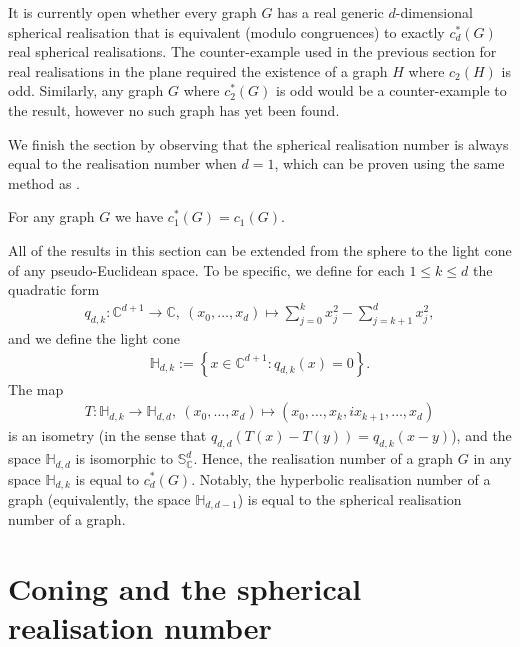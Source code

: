 \documentclass[ALCO]{cedram}
\begin{document}
\begin{remark}
	It is currently open whether every graph $G$ has a real generic $d$-dimensional spherical realisation that is equivalent (modulo congruences) to exactly $c_d^*(G)$ real spherical realisations.
	The counter-example used in the previous section for real realisations in the plane required the existence of a graph $H$ where $c_2(H)$ is odd.
	Similarly, any graph $G$ where $c^*_2(G)$ is odd would be a counter-example to the result, however no such graph has yet been found.
\end{remark}

We finish the section by observing that the spherical realisation number is always equal to the realisation number when $d=1$,
which can be proven using the same method as .

\begin{proposition}\label{p:1dsame}
	For any graph $G$ we have $c_1^*(G) =c_1(G)$.
\end{proposition}

\begin{remark}\label{rem:hyperbolic}
	All of the results in this section can be extended from the sphere to the light cone of any pseudo-Euclidean space.
	To be specific,
	we define for each $1 \leq k \leq d$ the quadratic form
	\begin{align*}
		q_{d,k}: \mathbb{C}^{d+1} \rightarrow \mathbb{C}, ~ (x_0,\ldots,x_{d}) \mapsto \sum_{j=0}^k x_j^2 - \sum_{j=k+1}^d x_j^2,
	\end{align*}
	and we define the light cone
	\begin{align*}
		\mathbb{H}_{d,k} := \left\{ x \in \mathbb{C}^{d+1} : q_{d,k}(x) = 0 \right\}.
	\end{align*}
	The map
	\begin{align*}
		T:\mathbb{H}_{d,k} \rightarrow \mathbb{H}_{d,d}, ~ (x_0,\ldots,x_d) \mapsto (x_0,\ldots, x_k, ix_{k+1},\ldots,x_d)
	\end{align*}
	is an isometry (in the sense that $q_{d,d}(T(x) - T(y)) = q_{d,k}(x-y)$),
	and the space $\mathbb{H}_{d,d}$ is isomorphic to $\mathbb{S}_{\mathbb{C}}^d$.
	Hence, the realisation number of a graph $G$ in any space $\mathbb{H}_{d,k}$ is equal to $c^*_d(G)$.
	Notably,
	the hyperbolic realisation number of a graph (equivalently, the space $\mathbb{H}_{d,d-1}$) is equal to the spherical realisation number of a graph. 
\end{remark}



\section{Coning and the spherical realisation number}\label{sec:cone}
\end{document}
